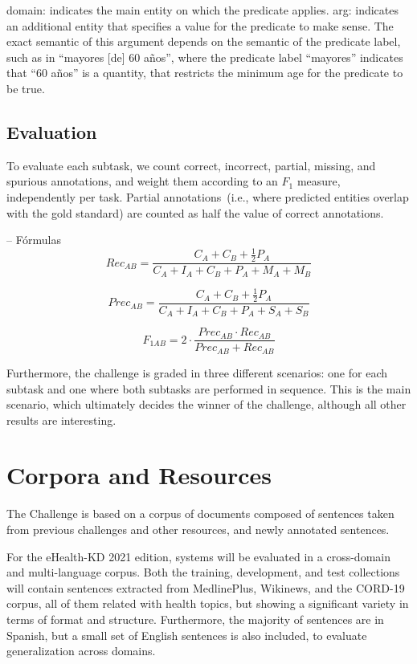 \documentclass[a4paper,11pt,twocolumn,twoside]{article}
\begin{document}
domain: indicates the main entity on which the predicate applies.
arg: indicates an additional entity that specifies a value for the predicate to make sense. The exact semantic of this argument depends on the semantic of the predicate label, such as in “mayores [de] 60 años”, where the predicate label “mayores” indicates that “60 años” is a quantity, that restricts the minimum age for the predicate to be true.

\subsection{Evaluation}

To evaluate each subtask, we count correct, incorrect, partial, missing, and spurious
annotations, and weight them according to an $F_1$ measure, independently per task.
Partial annotations~(i.e., where predicted entities overlap with the gold standard) are counted as half the value of correct annotations.

-- Fórmulas
$$Rec_{AB} = \frac{C_A + C_B + \frac{1}{2} P_A}{C_A + I_A + C_B + P_A + M_A + M_B}$$

$$Prec_{AB} = \frac{C_A + C_B + \frac{1}{2} P_A}{C_A + I_A + C_B + P_A + S_A + S_B}$$

$$F_{1AB} = 2 \cdot \frac{Prec_{AB} \cdot Rec_{AB}}{Prec_{AB} + Rec_{AB}}$$

Furthermore, the challenge is graded in three different scenarios:
one for each subtask and one where both subtasks are performed in sequence.
This is the main scenario, which ultimately decides the winner of the challenge,
although all other results are interesting.

\section{Corpora and Resources}\label{sec:resources}

The Challenge is based on a corpus of documents composed of
sentences taken from previous challenges and other resources,
and newly annotated sentences.

For the eHealth-KD 2021 edition, systems will be evaluated in a cross-domain and multi-language corpus.
Both the training, development, and test collections will contain sentences extracted from MedlinePlus, Wikinews, and the CORD-19 corpus,
all of them related with health topics, but showing a significant variety in terms of format and structure.
Furthermore, the majority of sentences are in Spanish, but a small set of English sentences is also included, to evaluate generalization across domains.
\end{document}
